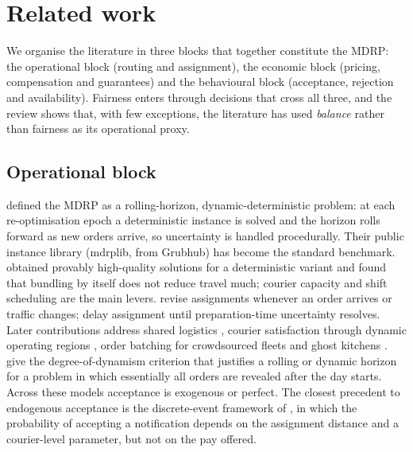 \documentclass[preprint,12pt,authoryear]{elsarticle}%
\begin{document}
\section{Related work}
\label{sec:related}

We organise the literature in three blocks that together constitute the MDRP: the operational block (routing and assignment), the economic block (pricing, compensation and guarantees) and the behavioural block (acceptance, rejection and availability). Fairness enters through decisions that cross all three, and the review shows that, with few exceptions, the literature has used \emph{balance} rather than fairness as its operational proxy.

\subsection{Operational block}

\citet{reyes2018meal} defined the MDRP as a rolling-horizon, dynamic-deterministic problem: at each re-optimisation epoch a deterministic instance is solved and the horizon rolls forward as new orders arrive, so uncertainty is handled procedurally. Their public instance library (mdrplib, from Grubhub) has become the standard benchmark. \citet{yildiz2019provably} obtained provably high-quality solutions for a deterministic variant and found that bundling by itself does not reduce travel much; courier capacity and shift scheduling are the main levers. \citet{steever2019dynamic} revise assignments whenever an order arrives or traffic changes; \citet{ulmer2021restaurant} delay assignment until preparation-time uncertainty resolves. Later contributions address shared logistics \citep{bi2023meal}, courier satisfaction through dynamic operating regions \citep{auad2023courier}, order batching for crowdsourced fleets \citep{simoni2023crowdsourced} and ghost kitchens \citep{neria2024restaurant}. \citet{pillac2013review} give the degree-of-dynamism criterion that justifies a rolling or dynamic horizon for a problem in which essentially all orders are revealed after the day starts. Across these models acceptance is exogenous or perfect. The closest precedent to endogenous acceptance is the discrete-event framework of \citet{quintero2020computational}, in which the probability of accepting a notification depends on the assignment distance and a courier-level parameter, but not on the pay offered.
\end{document}

